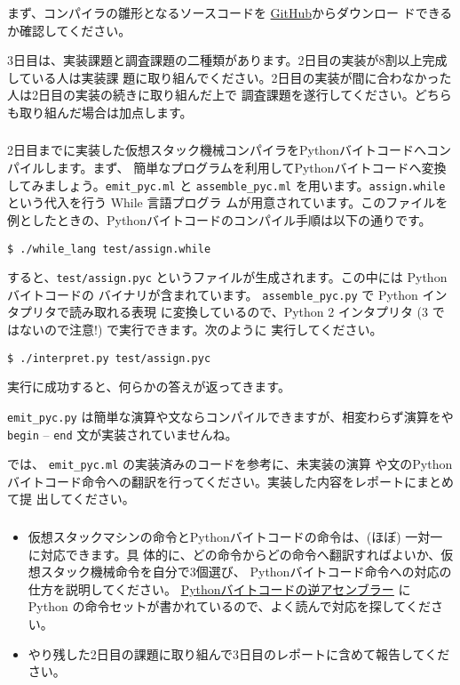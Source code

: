 \documentclass[a4paper,11pt]{jsarticle}
\begin{document}
まず、コンパイラの雛形となるソースコードを
\href{https://github.com/tmu-compiler-info-sys-exp-I/compiler-day3}{GitHub}からダウンロー
ドできるか確認してください。

3日目は、実装課題と調査課題の二種類があります。2日目の実装が8割以上完成している人は実装課
題に取り組んでください。2日目の実装が間に合わなかった人は2日目の実装の続きに取り組んだ上で
調査課題を遂行してください。どちらも取り組んだ場合は加点します。

\subsubsection{}

2日目までに実装した仮想スタック機械コンパイラをPythonバイトコードへコンパイルします。まず、
簡単なプログラムを利用してPythonバイトコードへ変換してみましょう。\verb|emit_pyc.ml| と
\verb|assemble_pyc.ml| を用います。\verb|assign.while| という代入を行う While 言語プログラ
ムが用意されています。このファイルを例としたときの、Pythonバイトコードのコンパイル手順は以下の通りです。

\begin{lstlisting}
$ ./while_lang test/assign.while
\end{lstlisting}

すると、\verb|test/assign.pyc| というファイルが生成されます。この中には Pythonバイトコードの
バイナリが含まれています。 \verb|assemble_pyc.py| で Python インタプリタで読み取れる表現
に変換しているので、Python 2 インタプリタ (3 ではないので注意!) で実行できます。次のように
実行してください。

\begin{lstlisting}
$ ./interpret.py test/assign.pyc
\end{lstlisting}

実行に成功すると、何らかの答えが返ってきます。

\verb|emit_pyc.py| は簡単な演算や文ならコンパイルできますが、相変わらず演算をや \verb|begin| --
\verb|end| 文が実装されていませんね。

では、 \verb|emit_pyc.ml| の実装済みのコードを参考に、未実装の演算
や文のPythonバイトコード命令への翻訳を行ってください。実装した内容をレポートにまとめて提
出してください。

\subsubsection{}

\begin{itemize}
\item 仮想スタックマシンの命令とPythonバイトコードの命令は、(ほぼ) 一対一に対応できます。具
  体的に、どの命令からどの命令へ翻訳すればよいか、仮想スタック機械命令を自分で3個選び、
  Pythonバイトコード命令への対応の仕方を説明してください。
  \href{https://docs.python.org/ja/3/library/dis.html}{Pythonバイトコードの逆アセンブラー}
  に Python の命令セットが書かれているので、よく読んで対応を探してください。
\item やり残した2日目の課題に取り組んで3日目のレポートに含めて報告してください。
\end{itemize}
\end{document}
